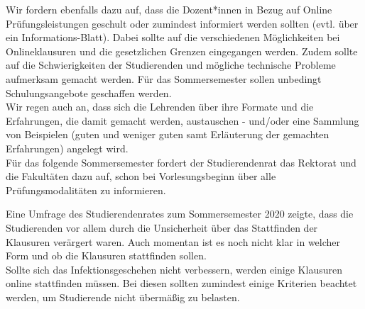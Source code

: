 {\begin{itemize}
        \end{itemize}
        Wir fordern ebenfalls dazu auf, dass die Dozent*innen in Bezug auf Online
        Prüfungsleistungen geschult
        oder zumindest informiert werden sollten (evtl. über ein Informations-Blatt). Dabei
        sollte auf die verschiedenen Möglichkeiten bei Onlineklausuren und die gesetzlichen
        Grenzen
        eingegangen werden. Zudem sollte auf die Schwierigkeiten der Studierenden und
        mögliche
        technische Probleme aufmerksam gemacht werden. Für das Sommersemester sollen
        unbedingt
        Schulungsangebote geschaffen werden.\\
        Wir regen auch an, dass sich die Lehrenden über ihre Formate und die Erfahrungen,
        die damit gemacht werden, austauschen - und/oder eine Sammlung von Beispielen 
        (guten und weniger guten samt Erläuterung der gemachten Erfahrungen) angelegt wird.\\
        Für das folgende Sommersemester fordert der Studierendenrat das Rektorat und die
        Fakultäten dazu
        auf, schon bei Vorlesungsbeginn über alle Prüfungsmodalitäten zu informieren.
        }{
        Eine Umfrage des Studierendenrates zum Sommersemester 2020 zeigte, dass die Studierenden vor
        allem durch die Unsicherheit über das Stattfinden der Klausuren verärgert waren. Auch momentan
        ist es noch nicht klar in welcher Form und ob die Klausuren stattfinden sollen.\\
        Sollte sich das Infektionsgeschehen nicht verbessern, werden einige Klausuren online stattfinden
        müssen. Bei diesen sollten zumindest einige Kriterien beachtet werden, um Studierende nicht
        übermäßig zu belasten. 
    }{
        \ul{}
    }{
    }
